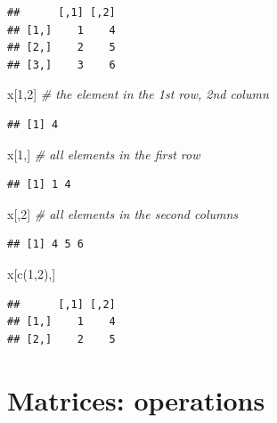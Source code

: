 \documentclass[
  11pt,
]{book}
\newenvironment{Shaded}{\begin{snugshade}}{\end{snugshade}}
\newcommand{\CommentTok}[1]{\textcolor[rgb]{0.56,0.35,0.01}{\textit{#1}}}
\newcommand{\DecValTok}[1]{\textcolor[rgb]{0.00,0.00,0.81}{#1}}
\newcommand{\FunctionTok}[1]{\textcolor[rgb]{0.00,0.00,0.00}{#1}}
\newcommand{\NormalTok}[1]{#1}
\begin{document}
\begin{verbatim}
##      [,1] [,2]
## [1,]    1    4
## [2,]    2    5
## [3,]    3    6
\end{verbatim}

\begin{Shaded}
\begin{Highlighting}[]
\NormalTok{x[}\DecValTok{1}\NormalTok{,}\DecValTok{2}\NormalTok{] }\CommentTok{\# the element in the 1st row, 2nd column}
\end{Highlighting}
\end{Shaded}

\begin{verbatim}
## [1] 4
\end{verbatim}

\begin{Shaded}
\begin{Highlighting}[]
\NormalTok{x[}\DecValTok{1}\NormalTok{,] }\CommentTok{\# all elements in the first row}
\end{Highlighting}
\end{Shaded}

\begin{verbatim}
## [1] 1 4
\end{verbatim}

\begin{Shaded}
\begin{Highlighting}[]
\NormalTok{x[,}\DecValTok{2}\NormalTok{] }\CommentTok{\# all elements in the second columns}
\end{Highlighting}
\end{Shaded}

\begin{verbatim}
## [1] 4 5 6
\end{verbatim}

\begin{Shaded}
\begin{Highlighting}[]
\NormalTok{x[}\FunctionTok{c}\NormalTok{(}\DecValTok{1}\NormalTok{,}\DecValTok{2}\NormalTok{),]}
\end{Highlighting}
\end{Shaded}

\begin{verbatim}
##      [,1] [,2]
## [1,]    1    4
## [2,]    2    5
\end{verbatim}

\hypertarget{matrices-operations}{%
\section{Matrices: operations}\label{matrices-operations}}
\end{document}
